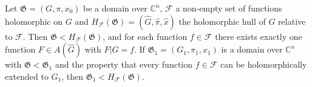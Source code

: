 Let $\mathfrak{G} = (G, \pi, x_0)$ be a domain over $\mathbb{C}^n$, $\mathcal{F}$ a non-empty set of functions holomorphic on $G$ and $H_{\mathcal{F}}(\mathfrak{G}) = (\hat{G}, \hat{\pi}, \hat{x})$ the holomorphic hull of $G$ relative to $\mathcal{F}$. Then $\mathfrak{G} < H_{\mathcal{F}}(\mathfrak{G})$, and for each function $f \in \mathcal{F}$ there exists exactly one function $F \in A(\hat{G})$ with $F|G = f$. If $\mathfrak{G}_1 = (G_1, \pi_1, x_1)$ is a domain over $\mathbb{C}^n$ with $\mathfrak{G} < \mathfrak{G}_1$ and the property that every function $f \in \mathcal{F}$ can be holomorphically extended to $G_1$, then $\mathfrak{G}_1 < H_{\mathcal{F}}(\mathfrak{G})$.
